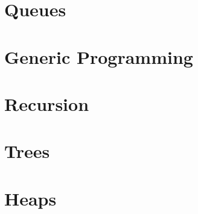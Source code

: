 \documentclass[c, aspectratio=169]{beamer}
\begin{document}
\begin{frame}\end{frame}
\begin{frame}\end{frame}

\section{Queues}
\begin{frame}\end{frame}
\begin{frame}\end{frame}
\begin{frame}\end{frame}

\section{Generic Programming}
\begin{frame}\end{frame}
\begin{frame}\end{frame}
\begin{frame}\end{frame}

\section{Recursion}
\begin{frame}\end{frame}
\begin{frame}\end{frame}
\begin{frame}\end{frame}

\section{Trees}
\begin{frame}\end{frame}
\begin{frame}\end{frame}
\begin{frame}\end{frame}

\section{Heaps}
\begin{frame}\end{frame}
\begin{frame}\end{frame}
\begin{frame}\end{frame}
\end{document}
